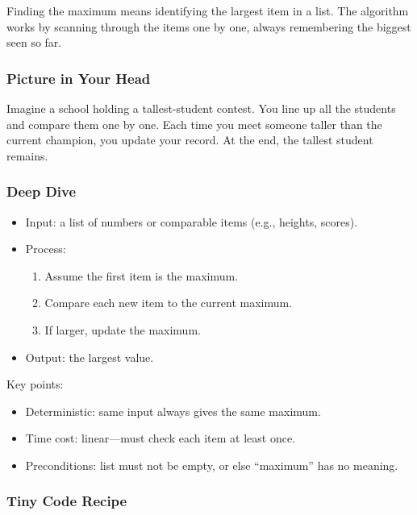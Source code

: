 \documentclass[
  letterpaper,
  DIV=11,
  numbers=noendperiod]{scrreprt}
\providecommand{\tightlist}{%
  \setlength{\itemsep}{0pt}\setlength{\parskip}{0pt}}
\begin{document}
Finding the maximum means identifying the largest item in a list. The
algorithm works by scanning through the items one by one, always
remembering the biggest seen so far.

\subsubsection{Picture in Your Head}\label{picture-in-your-head-93}

Imagine a school holding a tallest-student contest. You line up all the
students and compare them one by one. Each time you meet someone taller
than the current champion, you update your record. At the end, the
tallest student remains.

\subsubsection{Deep Dive}\label{deep-dive-63}

\begin{itemize}
\item
  Input: a list of numbers or comparable items (e.g., heights, scores).
\item
  Process:

  \begin{enumerate}
  \def\labelenumi{\arabic{enumi}.}
  \tightlist
  \item
    Assume the first item is the maximum.
  \item
    Compare each new item to the current maximum.
  \item
    If larger, update the maximum.
  \end{enumerate}
\item
  Output: the largest value.
\end{itemize}

Key points:

\begin{itemize}
\tightlist
\item
  Deterministic: same input always gives the same maximum.
\item
  Time cost: linear---must check each item at least once.
\item
  Preconditions: list must not be empty, or else ``maximum'' has no
  meaning.
\end{itemize}

\subsubsection{Tiny Code Recipe}\label{tiny-code-recipe-91}
\end{document}
